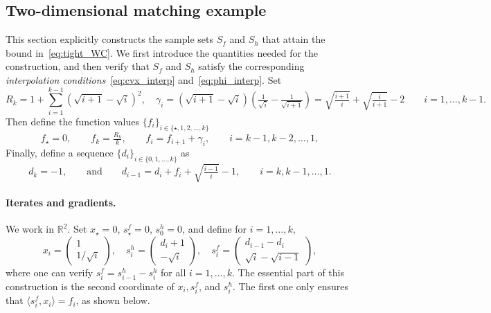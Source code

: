\documentclass[a4paper]{article}
\newcommand{\R}{\mathbb{R}}
\newcommand{\ip}[2]{\langle #1, #2\rangle}
\begin{document}
\subsection{Two-dimensional matching example}\label{sec:tight_details}
This section explicitly constructs the sample sets $S_f$ and $S_h$ that attain the bound in~\eqref{eq:tight_WC}. We first introduce the quantities
needed for the construction, and then verify that $S_f$ and $S_h$ satisfy the
corresponding \emph{interpolation conditions}~\eqref{eq:cvx_interp} and~\eqref{eq:phi_interp}. Set
\[
        R_k= 1+\sum_{i=1}^{k-1}(\sqrt{i+1}-\sqrt i)^2, \quad
        \gamma_i
        = 
        (\sqrt{i+1}-\sqrt i)
        \left(\tfrac1{\sqrt i}-\tfrac1{\sqrt{i+1}}\right)
        =
        \sqrt{\tfrac{i+1}{i}}+\sqrt{\tfrac{i}{i+1}}-2 \qquad i=1,\ldots,k-1.
\]
Then define the function values $\{f_i\}_{i\in\{\star,1,2,\ldots,k\}}$
\begin{equation}
  \label{eq:constr_f}
f_\star = 0, \qquad 
        f_k= \tfrac{R_k}{k},
        \qquad
        f_i= f_{i+1}+\gamma_i,
        \qquad i=k-1, k-2,\ldots,1,  
\end{equation}
Finally, define a sequence $\{d_i\}_{i\in\{0, 1,\ldots,k\}}$ as
\begin{equation}\label{eq:d_i}
d_k= -1,
\qquad \text{and}\qquad
d_{i-1}= d_i+f_i+\sqrt{\tfrac{i-1}{i}}-1, \qquad i=k,k-1,\ldots,1.
\end{equation}

\paragraph{Iterates and gradients.}
We work in \(\R^2\). 
Set $x_\star= 0$, $s_\star^f= 0$, $s_0^h= 0$, and define for $i=1,\ldots,k$,
\begin{equation}\label{eq:x_i_and_s_i}
        x_i= 
        \begin{pmatrix}
        1\\
        1/\sqrt i
        \end{pmatrix},\quad
        s_i^h= 
        \begin{pmatrix}
        d_i+1\\
        -\sqrt i
        \end{pmatrix},\quad
        s_i^f= 
        \begin{pmatrix}
        d_{i-1}-d_i\\
        \sqrt i-\sqrt{i-1}
        \end{pmatrix},
\end{equation}
where one can verify $s_i^f=s_{i-1}^h-s_i^h$ for all $i=1,\ldots,k$.
The essential part of this construction is the second coordinate of
$x_i, s^f_i$, and $s^h_i$. The first one only ensures that 
$\ip{s_i^f}{x_i} = f_i$, as shown below.
\end{document}
